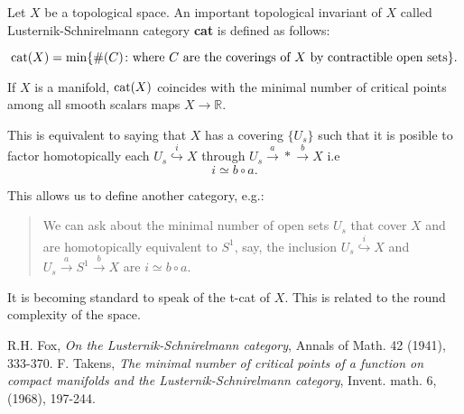 \documentclass[12pt]{article}
\begin{document}
Let $X$ be a topological space.  An important topological invariant of $X$ called Lusternik-Schnirelmann category {\bf cat} is defined as follows:

$${\rm cat}(X)={\rm min}\{\#(C)\colon\mbox{where $C$ are the coverings of $X$ by contractible open sets}\}.$$

If $X$ is a manifold, ${\rm cat}(X)$ coincides with the minimal number of critical points among all smooth scalars maps $X\to\mathbb{R}$. 

This is equivalent to saying that $X$ has a covering $\{U_s\}$ such that
it is posible to factor homotopically each $U_s\stackrel{i}\hookrightarrow X$ through $U_s\stackrel{a}\to *\stackrel{b}\to X$ i.e
$$i\simeq b\circ a.$$

This allows us to define another category, e.g.:\\
\begin{quote}
We can ask about the minimal number of open sets $U_s$ that cover $X$ and 
are homotopically equivalent to $S^1$, say, 
the inclusion  $U_s\stackrel{i}\hookrightarrow X$ and $U_s\stackrel{a}\to S^1\stackrel{b}\to X$ are $i\simeq b\circ a$.
\end{quote}

It is becoming standard to speak of the t-cat of $X$. 
This is related to the round complexity of the space.  


\begin{thebibliography}{1}
R.H. Fox, {\it On the Lusternik-Schnirelmann category}, Annals of Math. 42 (1941), 333-370.
F. Takens, {\it The minimal number of critical points of a function on compact manifolds and the Lusternik-Schnirelmann category}, Invent. math. 6,(1968), 197-244.

\end{thebibliography}

\end{document}
